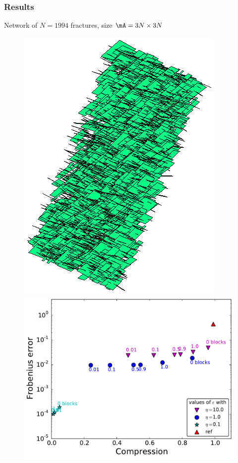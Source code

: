 \begin{frame}
\frametitle{Results}

\small

Network of $N=1994$ \alert{fractures}, size $\mA=3N\times 3N$
\vspace{-5pt}
\begin{figure}
\centering
\begin{minipage}[c]{.39\linewidth}
\includegraphics[width=.9\textwidth]{../images/visu_maillage1994Fracs.png}
\end{minipage}
\begin{minipage}[c]{.6\linewidth}
\includegraphics[width=\textwidth]{../images/graphe_compasparse_output_compression_18_08_2016matrice1994Fracs.pdf}
\end{minipage}
\end{figure}


\end{frame}
